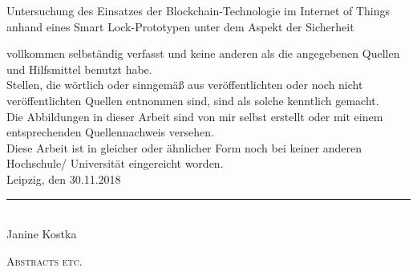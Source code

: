 \documentclass[toc=sectionentrywithdots,a4paper,12pt,oneside]{scrartcl}
\newcommand{\thema}{Untersuchung des Einsatzes der Blockchain-Technologie im Internet of Things anhand eines Smart Lock-Prototypen unter dem Aspekt der Sicherheit}
\newcommand{\name}{Janine Kostka}
\newcommand{\abgabe}{30.11.2018}
\begin{document}
	\vspace*{1em}
	\begin{center}
		\thema
	\end{center}
	\vspace*{1em}
	vollkommen selbständig verfasst und keine anderen als die angegebenen Quellen und
	Hilfsmittel benutzt habe.
	\\[2em]
	Stellen, die wörtlich oder sinngemäß aus veröffentlichten oder noch nicht veröffentlichten
	Quellen entnommen sind, sind als solche kenntlich gemacht.
	\\[2em]
	Die Abbildungen in dieser Arbeit sind von mir selbst erstellt oder mit einem entsprechenden
	Quellennachweis versehen.
	\\[2em]
	Diese Arbeit ist in gleicher oder ähnlicher Form noch bei keiner anderen Hochschule/
	Universität eingereicht worden.
	\\[6em]
	
	Leipzig, den \abgabe \tab \rule{6cm}{0.5pt}\\
	\hspace*{22em}\name
	\newpage
	
	\thispagestyle{empty}
	
	\textsc{{\LARGE Abstracts etc.}}
	
	\newpage
	
	\normalsize
	\tableofcontents
	\newpage
	\listoffigures
	\newpage
	\listoftables
	\newpage
	\printglossary[type=\acronymtype]
	\thispagestyle{empty}
	\newpage
	

    
    \newpage
    
    
    
    
    
    \newpage
    
    
    
    \newpage
    
    
    
    
    
    \newpage
    
    \newpage
    
    \newpage
    

    \newpage	
    \printbibliography[title=Literaturverzeichnis]

    \newpage
    \appendix
    \renewcommand{\thesection}{\Roman{section}}
    \appendixpage
    \addappheadtotoc
    
\end{document}
